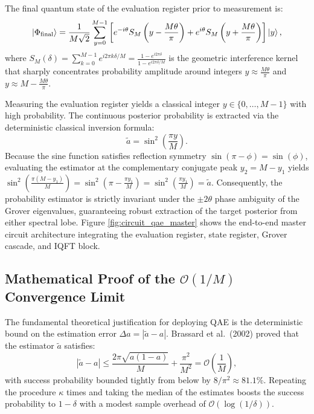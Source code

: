 The final quantum state of the evaluation register prior to measurement is:
\begin{equation}
\left|\Phi_{\mathrm{final}}\right\rangle = \frac{1}{M \sqrt{2}} \sum_{y=0}^{M-1} \left[ e^{-i\theta} S_M\left(y - \frac{M\theta}{\pi}\right) + e^{i\theta} S_M\left(y + \frac{M\theta}{\pi}\right) \right] \left|y\right\rangle,
\label{eq:eval_register_final_state}
\end{equation}
where $S_M(\delta) = \sum_{k=0}^{M-1} e^{i 2\pi k \delta / M} = \frac{1 - e^{i 2\pi \delta}}{1 - e^{i 2\pi \delta / M}}$ is the geometric interference kernel that sharply concentrates probability amplitude around integers $y \approx \frac{M\theta}{\pi}$ and $y \approx M - \frac{M\theta}{\pi}$.

Measuring the evaluation register yields a classical integer $y \in \{0, \dots, M-1\}$ with high probability. The continuous posterior probability is extracted via the deterministic classical inversion formula:
\begin{equation}
\tilde{a} = \sin^2\left(\frac{\pi y}{M}\right).
\label{eq:qae_probability_estimator_ch3}
\end{equation}
Because the sine function satisfies reflection symmetry $\sin(\pi - \phi) = \sin(\phi)$, evaluating the estimator at the complementary conjugate peak $y_2 = M - y_1$ yields $\sin^2\left(\frac{\pi(M - y_1)}{M}\right) = \sin^2\left(\pi - \frac{\pi y_1}{M}\right) = \sin^2\left(\frac{\pi y_1}{M}\right) = \tilde{a}$. Consequently, the probability estimator is strictly invariant under the $\pm 2\theta$ phase ambiguity of the Grover eigenvalues, guaranteeing robust extraction of the target posterior from either spectral lobe. Figure \ref{fig:circuit_qae_master} shows the end-to-end master circuit architecture integrating the evaluation register, state register, Grover cascade, and IQFT block.

\subsection{Mathematical Proof of the \texorpdfstring{$\mathcal{O}(1/M)$}{O(1/M)} Convergence Limit}
The fundamental theoretical justification for deploying QAE is the deterministic bound on the estimation error $\Delta a = |\tilde{a} - a|$. Brassard et al.~(2002) proved that the estimator $\tilde{a}$ satisfies:
\begin{equation}
|\tilde{a} - a| \le \frac{2\pi \sqrt{a(1-a)}}{M} + \frac{\pi^2}{M^2} = \mathcal{O}\left(\frac{1}{M}\right),
\label{eq:brassard_inequality_ch3}
\end{equation}
with success probability bounded tightly from below by $8/\pi^2 \approx 81.1\%$. Repeating the procedure $\kappa$ times and taking the median of the estimates boosts the success probability to $1 - \delta$ with a modest sample overhead of $\mathcal{O}(\log(1/\delta))$.


